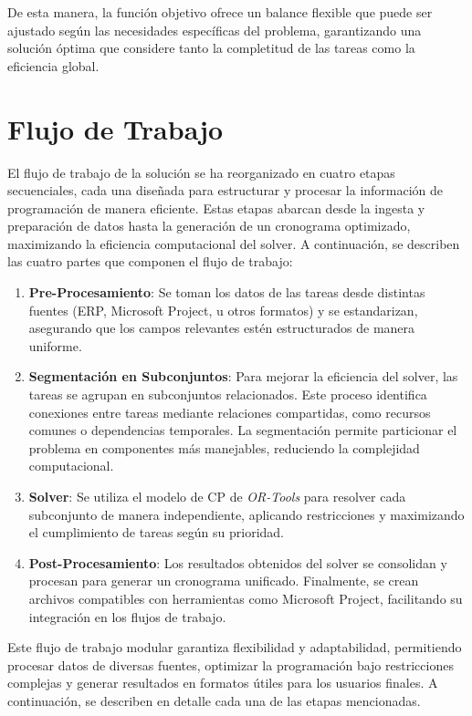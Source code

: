 \documentclass{article}
\begin{document}
De esta manera, la función objetivo ofrece un balance flexible que puede ser ajustado según las necesidades específicas del problema, garantizando una solución óptima que considere tanto la completitud de las tareas como la eficiencia global.



\section{Flujo de Trabajo}

El flujo de trabajo de la solución se ha reorganizado en cuatro etapas secuenciales, cada una diseñada para estructurar y procesar la información de programación de manera eficiente. Estas etapas abarcan desde la ingesta y preparación de datos hasta la generación de un cronograma optimizado, maximizando la eficiencia computacional del solver. A continuación, se describen las cuatro partes que componen el flujo de trabajo:

\begin{enumerate}
    \item \textbf{Pre-Procesamiento}: Se toman los datos de las tareas desde distintas fuentes (ERP, Microsoft Project, u otros formatos) y se estandarizan, asegurando que los campos relevantes estén estructurados de manera uniforme.

    \item \textbf{Segmentación en Subconjuntos}: Para mejorar la eficiencia del solver, las tareas se agrupan en subconjuntos relacionados. Este proceso identifica conexiones entre tareas mediante relaciones compartidas, como recursos comunes o dependencias temporales. La segmentación permite particionar el problema en componentes más manejables, reduciendo la complejidad computacional.

    \item \textbf{Solver}: Se utiliza el modelo de CP de \textit{OR-Tools} para resolver cada subconjunto de manera independiente, aplicando restricciones y maximizando el cumplimiento de tareas según su prioridad.

    \item \textbf{Post-Procesamiento}: Los resultados obtenidos del solver se consolidan y procesan para generar un cronograma unificado. Finalmente, se crean archivos compatibles con herramientas como Microsoft Project, facilitando su integración en los flujos de trabajo.
\end{enumerate}

Este flujo de trabajo modular garantiza flexibilidad y adaptabilidad, permitiendo procesar datos de diversas fuentes, optimizar la programación bajo restricciones complejas y generar resultados en formatos útiles para los usuarios finales. A continuación, se describen en detalle cada una de las etapas mencionadas.
\end{document}
